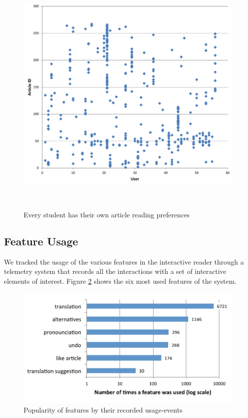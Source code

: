 \begin{figure}[h!]
\centering
  \includegraphics[width=\columnwidth]{figures/users_articles}
  \caption{Every student has their own article reading preferences}~\label{fig:registrations}
\end{figure}

\subsection{Feature Usage}
\newcommand{\feature}[1]{{\em #1}}
We tracked the usage of the various features in the interactive reader through a telemetry system that records all the interactions with a set of interactive elements of interest. Figure \ref{fig:feature_usage} shows the six most used features of the system. 

  \begin{figure}[h!]
  \centering
    \includegraphics[width=0.9\columnwidth]{figures/reader_feature_usage}
    \caption{Popularity of features by their recorded usage-events}
    \label{fig:feature_usage}
  \end{figure}

